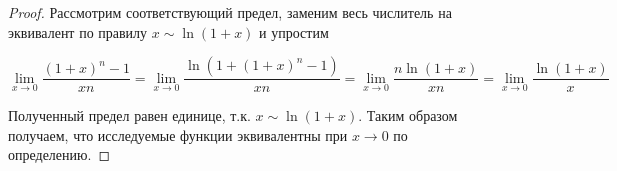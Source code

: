 \begin{proof}
  Рассмотрим соответствующий предел, заменим весь числитель на эквивалент по
  правилу \(x \sim \ln(1 + x)\) и упростим

  \begin{equation*}
    \lim_{x \to 0} \frac{(1 + x)^n - 1}{x n}
    = \lim_{x \to 0} \frac{\ln(1 + (1 + x)^n - 1)}{x n}
    = \lim_{x \to 0} \frac{n \ln(1 + x)}{x n}
    = \lim_{x \to 0}{\frac{\ln(1 + x)}{x}}
  \end{equation*}
  
  Полученный предел равен единице, т.к. \(x \sim \ln(1 + x)\). Таким образом
  получаем, что исследуемые функции эквивалентны при \(x \to 0\) по определению.  
\end{proof}
